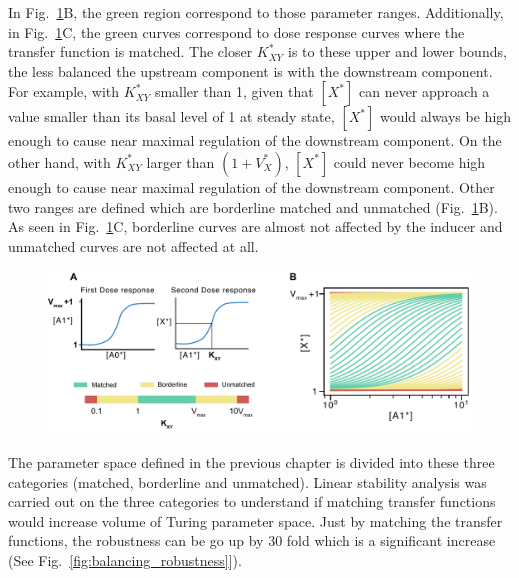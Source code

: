 In Fig.~\ref{fig:balancing}B, the green region correspond to those parameter ranges.
Additionally, in Fig.~\ref{fig:balancing}C, the green curves correspond to dose response curves where the transfer function is matched.
The closer $K^*_{XY}$ is to these upper and lower bounds, the less balanced the upstream component is with the downstream component.
For example, with $K^*_{XY}$ smaller than 1, given that $[X^*]$ can never approach a value smaller than its basal level of 1 at steady state, $[X^*]$ would always be high enough to cause near maximal regulation of the downstream component.
On the other hand, with $K^*_{XY}$ larger than $(1+V^*_{X})$, $[X^*]$ could never become high enough to cause near maximal regulation of the downstream component.
Other two ranges are defined which are borderline matched and unmatched (Fig.~\ref{fig:balancing}B).
As seen in Fig.~\ref{fig:balancing}C, borderline curves are almost not affected by the inducer and unmatched curves are not affected at all.


\begin{figure}[H]
    \centering
    \includegraphics[width=1\textwidth]{chapters/Chapter 2/balancing}
    \caption[]{\textbf{} } %
    \label{fig:balancing}
\end{figure}


The parameter space defined in the previous chapter is divided into these three categories (matched, borderline and unmatched).
Linear stability analysis was carried out on the three categories to understand if matching transfer functions would increase volume of Turing parameter space.
Just by matching the transfer functions, the robustness can be go up by 30 fold which is a significant increase (See Fig.~\ref{fig:balancing_robustness}]).


